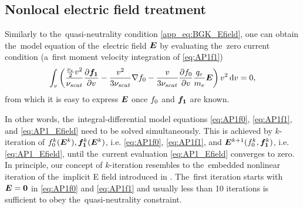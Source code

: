 \subsection{Nonlocal electric field treatment}
\label{sec:Efield}

Similarly to the~quasi-neutrality condition \eqref{app_eq:BGK_Efield}, 
one can obtain the~model equation of the~electric field $\boldsymbol{E}$ by evaluating 
the~zero current condition (a~first moment velocity integration of 
\eqref{eq:AP1f1})
\begin{equation}
  \int_{v} \left(\frac{\frac{\nu_{e}}{2}v^2}{\nu_{scat}}
  \frac{\partial{\boldsymbol{f_1}}}{\partial{v}} 
  - \frac{v^2}{3\nu_{scat}}
  \nabla f_0 
  - \frac{v}{3\nu_{scat}}\frac{\partial{f_0}}{\partial{v}}\frac{q_e}{m_e}\boldsymbol{E}
  \right) v^2\, \text{d}v = 0 ,
  \label{eq:AP1_Efield}
\end{equation}
from which it is easy to express $\boldsymbol{E}$ once $f_0$ and $\boldsymbol{f_1}$ are known.

In other words, the~integral-differential model equations 
\eqref{eq:AP1f0}, \eqref{eq:AP1f1}, and \eqref{eq:AP1_Efield}
need to be solved simultaneously. This is achieved by $k$-iteration of 
$f_0^k(\boldsymbol{E}^k), \boldsymbol{f_1}^k(\boldsymbol{E}^k)$, i.e. \eqref{eq:AP1f0}, \eqref{eq:AP1f1}, and 
$\boldsymbol{E}^{k+1}(f_0^k, \boldsymbol{f_1}^k)$, i.e.  \eqref{eq:AP1_Efield}, until 
the~current evaluation \eqref{eq:AP1_Efield} converges to zero. In principle,
our concept of $k$-iteration resembles to the~embedded nonlinear iteration
of the~implicit E field introduced in \cite{Kingham_JCP2004}.
The~first iteration starts with $\boldsymbol{E}=\boldsymbol{0}$ in \eqref{eq:AP1f0} and 
\eqref{eq:AP1f1} and usually less than 10 iterations is sufficient to obey
the~quasi-neutrality constraint.


